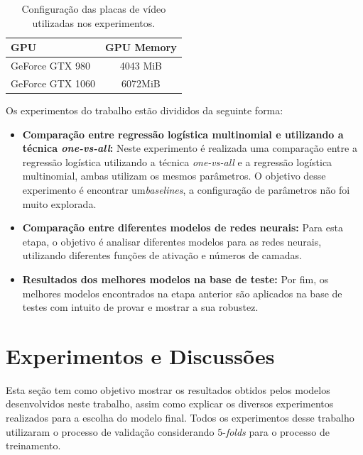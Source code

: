 \documentclass[conference]{IEEEtran}
\begin{document}
\begin{table}[h!]
	\centering
	\begin{tabular}{lc} \toprule
		  \textbf{GPU} & \textbf{GPU Memory} \\ \toprule 	
		  GeForce GTX 980 & 4043 MiB \\ 
		  GeForce GTX 1060 & 6072MiB \\ 
		 \bottomrule
	\end{tabular}
	\caption{Configuração das placas de vídeo utilizadas nos experimentos.}
	\label{tab:config}
\end{table}

Os experimentos do trabalho estão divididos da seguinte forma: 

\begin{itemize}
	\item \textbf{Comparação entre regressão logística multinomial e utilizando a técnica \emph{one-vs-all}:} Neste experimento é realizada uma comparação entre a regressão logística utilizando a técnica \emph{one-vs-all} e a regressão logística multinomial, ambas utilizam os mesmos parâmetros. O objetivo desse experimento é encontrar um\emph{baselines}, a configuração de parâmetros não foi muito explorada.
	
	\item \textbf{Comparação entre diferentes modelos de redes neurais:} Para esta etapa, o objetivo é analisar diferentes modelos para as redes neurais, utilizando diferentes funções de ativação e números de camadas.  
	
	\item \textbf{Resultados dos melhores modelos na base de teste:} Por fim, os melhores modelos encontrados na etapa anterior são aplicados na base de testes com intuito de provar e mostrar a sua robustez.
\end{itemize}


\section{Experimentos e Discussões}

Esta seção tem como objetivo mostrar os resultados obtidos pelos modelos desenvolvidos neste trabalho, assim como explicar os diversos experimentos realizados para a escolha do modelo final. Todos os experimentos desse trabalho utilizaram o processo de validação considerando $5$-\emph{folds} para o processo de treinamento. 
\end{document}
